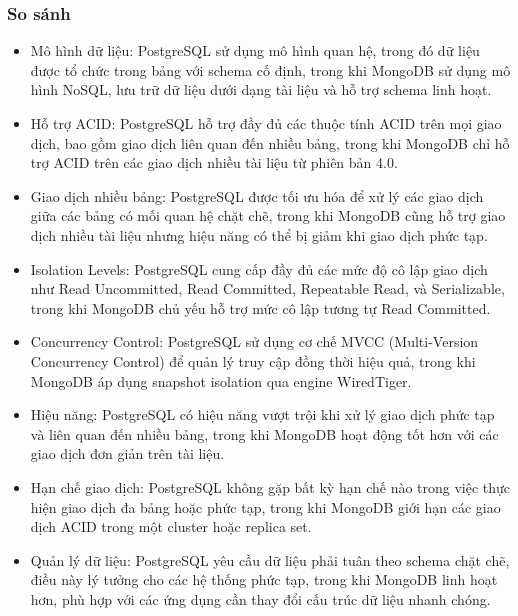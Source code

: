 \subsubsection{So sánh}
\begin{itemize}
    \item Mô hình dữ liệu: PostgreSQL sử dụng mô hình quan hệ, trong đó dữ liệu được tổ chức trong bảng với schema cố định, trong khi MongoDB sử dụng mô hình NoSQL, lưu trữ dữ liệu dưới dạng tài liệu và hỗ trợ schema linh hoạt.
    \item Hỗ trợ ACID: PostgreSQL hỗ trợ đầy đủ các thuộc tính ACID trên mọi giao dịch, bao gồm giao dịch liên quan đến nhiều bảng, trong khi MongoDB chỉ hỗ trợ ACID trên các giao dịch nhiều tài liệu từ phiên bản 4.0.
    \item Giao dịch nhiều bảng: PostgreSQL được tối ưu hóa để xử lý các giao dịch giữa các bảng có mối quan hệ chặt chẽ, trong khi MongoDB cũng hỗ trợ giao dịch nhiều tài liệu nhưng hiệu năng có thể bị giảm khi giao dịch phức tạp.
    \item Isolation Levels: PostgreSQL cung cấp đầy đủ các mức độ cô lập giao dịch như Read Uncommitted, Read Committed, Repeatable Read, và Serializable, trong khi MongoDB chủ yếu hỗ trợ mức cô lập tương tự Read Committed.
    \item Concurrency Control: PostgreSQL sử dụng cơ chế MVCC (Multi-Version Concurrency Control) để quản lý truy cập đồng thời hiệu quả, trong khi MongoDB áp dụng snapshot isolation qua engine WiredTiger.
    \item Hiệu năng: PostgreSQL có hiệu năng vượt trội khi xử lý giao dịch phức tạp và liên quan đến nhiều bảng, trong khi MongoDB hoạt động tốt hơn với các giao dịch đơn giản trên tài liệu.
    \item Hạn chế giao dịch: PostgreSQL không gặp bất kỳ hạn chế nào trong việc thực hiện giao dịch đa bảng hoặc phức tạp, trong khi MongoDB giới hạn các giao dịch ACID trong một cluster hoặc replica set.
    \item Quản lý dữ liệu: PostgreSQL yêu cầu dữ liệu phải tuân theo schema chặt chẽ, điều này lý tưởng cho các hệ thống phức tạp, trong khi MongoDB linh hoạt hơn, phù hợp với các ứng dụng cần thay đổi cấu trúc dữ liệu nhanh chóng.
\end{itemize}
